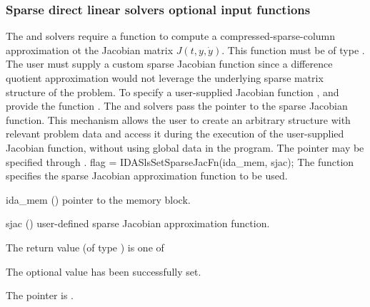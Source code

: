 {%
\subsubsection{Sparse direct linear solvers optional input functions}
\label{sss:optin_sls}
The 
{\idaklu} and {\idasuperlumt} solvers require a function to compute a
compressed-sparse-column approximation ot the Jacobian matrix $J(t,y,\dot{y})$.  
This function must be of type . 
The user must supply a custom sparse Jacobian function since a
difference quotient approximation would not leverage the underlying
sparse matrix structure of the problem.  To specify a user-supplied
Jacobian function , {\idaklu} and {\idasuperlumt} provide
the function .  The {\idaklu} and
{\idasuperlumt} solvers pass the pointer  to the sparse
Jacobian function. This mechanism allows the user to create an arbitrary
structure with relevant problem data and access it during the
execution of the user-supplied Jacobian function, without using global
data in the program.  The pointer  may be specified
through .
{
  flag = IDASlsSetSparseJacFn(ida\_mem, sjac);
}
{
  The function  specifies the sparse Jacobian
  approximation function to be used.
}
{
  \begin{args}
  \item[ida\_mem] ()
    pointer to the {\ida} memory block.
  \item[sjac] ()
    user-defined sparse Jacobian approximation function.
  \end{args}
}
{
  The return value  (of type ) is one of
  \begin{args}
  \item[\Id{IDASLS\_SUCCESS}] 
    The optional value has been successfully set.
  \item[\Id{IDASLS\_MEM\_NULL}]
    The  pointer is .
  \item[\Id{IDASLS\_LMEM\_NULL}]

\end{args}}}
